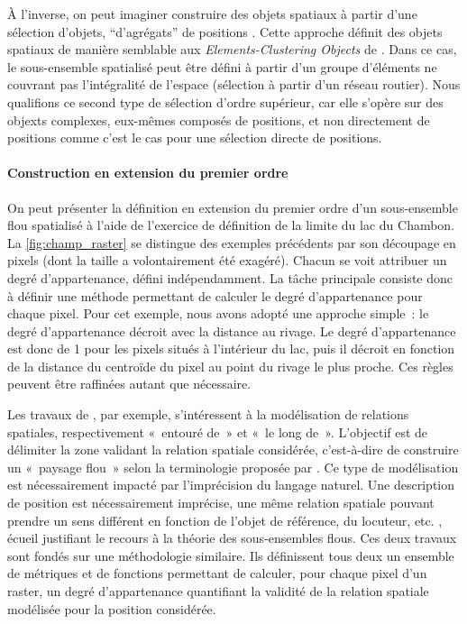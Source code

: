 À l’inverse, on peut imaginer construire des objets spatiaux à partir
d’une sélection d’objets, \enquote{d’agrégats} de positions
\autocite{Charre1995}. Cette approche définit des objets spatiaux de
manière semblable aux \emph{Elements-Clustering Objects} de
\textcite{Liu2019}. Dans ce cas, le sous-ensemble spatialisé peut être
défini à partir d’un groupe d’éléments ne couvrant pas l’intégralité
de l’espace (\eg sélection à partir d’un réseau routier). Nous
qualifions ce second type de sélection d’ordre supérieur, car elle
s’opère sur des objexts complexes, eux-mêmes composés de positions, et
non directement de positions comme c’est le cas pour une sélection
directe de positions.

\paragraph{Construction en extension du premier ordre}

On peut présenter la définition en extension du premier ordre d’un
sous-ensemble flou spatialisé à l’aide de l’exercice de définition de
la limite du lac du Chambon. La \autoref{fig:champ_raster} se
distingue des exemples précédents par son découpage en pixels (dont la
taille a volontairement été exagéré). Chacun se voit attribuer un
degré d’appartenance, défini indépendamment. La tâche principale
consiste donc à définir une méthode permettant de calculer le degré
d’appartenance pour chaque pixel. Pour cet exemple, nous avons adopté
une approche simple : le degré d’appartenance décroit avec la distance
au rivage. Le degré d’appartenance est donc de 1 pour les pixels
situés à l’intérieur du lac, puis il décroit en fonction de la
distance du centroïde du pixel au point du rivage le plus proche. Ces
règles peuvent être raffinées autant que nécessaire.

Les travaux de \textcite{Vanegas2011,Takemura2012}, par exemple,
s’intéressent à la modélisation de relations spatiales, respectivement
« entouré de » et « le long de ». L’objectif est de délimiter la zone
validant la relation spatiale considérée, c’est-à-dire de construire
un « paysage flou » selon la terminologie proposée par
\textcite{Bloch1996}. Ce type de modélisation est nécessairement
impacté par l’imprécision du langage naturel. Une description de
position est nécessairement imprécise, une même relation spatiale
pouvant prendre un sens différent en fonction de l’objet de référence,
du locuteur, etc. \autocite{Vandeloise1986,Borillo1998,Bateman2010},
écueil justifiant le recours à la théorie des sous-ensembles
flous. Ces deux travaux sont fondés sur une méthodologie
similaire. Ils définissent tous deux un ensemble de métriques et de
fonctions permettant de calculer, pour chaque pixel d’un raster, un
degré d’appartenance quantifiant la validité de la relation spatiale
modélisée pour la position considérée.

